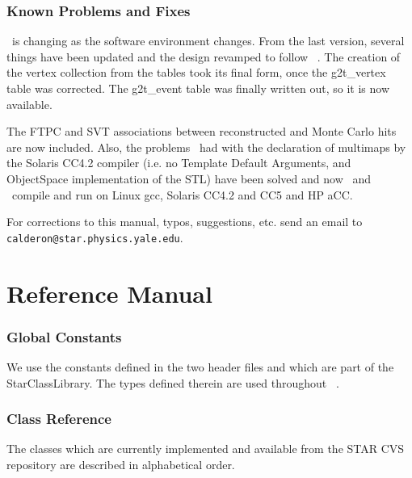 
\section{Known Problems and Fixes}

\StMcEvent\ is changing as the software environment changes.  From the last
version, several things have been updated and the design revamped to
follow \StEvent\ .
The creation of the vertex collection from the tables took its final
form, once the g2t\_vertex table was corrected.  The g2t\_event table was
finally written out, so it is now available.

The FTPC and SVT associations between reconstructed and Monte Carlo
hits are now included.
Also, the problems \StAssociationMaker\ had with the declaration of multimaps
by the Solaris CC4.2 compiler (i.e. no Template Default Arguments, and
ObjectSpace implementation of the STL) have been solved and
now \StMcEvent\ and \StAssociationMaker\ compile and run
on Linux gcc, Solaris CC4.2 and CC5 and HP aCC.

For corrections to this manual, typos, suggestions, etc. send an email
to {\tt calderon@star.physics.yale.edu}.
\clearpage

%
%
\part{Reference Manual}
\label{sec:refman}
\clearpage


\section{Global Constants}

We use the constants defined in the two header files
  and
 which are part of the StarClassLibrary.
The types defined therein are used
throughout \StMcEvent\ .




\section{Class Reference}
The classes which are currently implemented and available from the
STAR CVS repository are described in alphabetical order.


